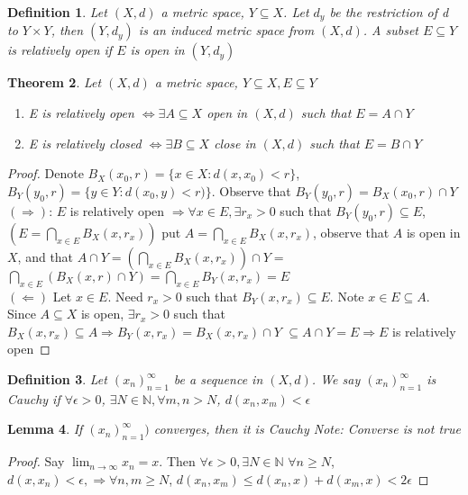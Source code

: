 \documentclass{article}
\newtheorem{theorem}{Theorem}[section]
\newtheorem{lemma}[theorem]{Lemma}
\newtheorem{definition}[theorem]{Definition}
\begin{document}
\begin{definition}
    Let $(X, d)$ a metric space, $Y \subseteq X$. Let $d_y$ be the restriction of d to
    $Y \times Y$, then $(Y, d_y)$ is an induced metric space from $(X, d)$. A subset
    $E\subseteq Y$ is relatively open if $E$ is open in $(Y, d_y)$
\end{definition}
\begin{theorem}
    Let $(X, d)$ a metric space, $Y \subseteq X, E \subseteq Y$
    \begin{enumerate}
        \item E is relatively open $\Leftrightarrow \exists A \subseteq X$ open in
            $(X,d)$ such that $E = A \cap Y$
        \item E is relatively closed $\Leftrightarrow \exists B \subseteq X$ close in
            $(X,d)$ such that $E = B \cap Y$
    \end{enumerate}
\end{theorem}
\begin{proof}
    Denote $B_{X}(x_0, r) = \{x \in X : d(x, x_0) < r\}$,
    $B_{Y}(y_0, r) = \{y \in Y : d(x_0, y) < r)\}$. Observe that
    $B_{Y}(y_0, r) = B_{X}(x_0, r) \cap Y$ \\
    $(\Rightarrow)$: $E$ is relatively open $\Rightarrow\forall x\in E,\exists r_x > 0$
    such that $B_{Y}(y_0, r) \subseteq E$, $(E = \bigcap\limits_{x\in E} B_{X}(x, r_x))$
    put $A = \bigcap\limits_{x\in E} B_{X}(x, r_x)$, observe that $A$ is open in $X$, and
    that $A \cap Y = (\bigcap\limits_{x\in E} B_{X}(x, r_x)) \cap Y =$
    $\bigcap\limits_{x\in E} (B_X(x, r) \cap Y)= \bigcap\limits_{x\in E} B_{Y}(x, r_x)=E$
    \\
    $(\Leftarrow)$ Let $x \in E$. Need $r_x > 0$ such that $B_{Y}(x, r_x) \subseteq E$.
    Note $x \in E \subseteq A$. Since $A \subseteq X$ is open, $\exists r_x > 0$ such
    that $B_{X}(x, r_x) \subseteq A \Rightarrow B_{Y}(x, r_x) = B_{X}(x, r_x) \cap Y$
    $\subseteq A \cap Y = E \Rightarrow E$ is relatively open
\end{proof}

\begin{definition}
    Let $(x_n)_{n=1}^{\infty}$ be a sequence in $(X, d)$. We say $(x_n)_{n=1}^{\infty}$
    is Cauchy if $\forall \epsilon > 0$, $\exists N \in \mathbb{N}, \forall m, n > N$,
    $d(x_n, x_m) < \epsilon$
\end{definition}

\begin{lemma}
    If $(x_n)_{n=1}^{\infty})$ converges, then it is Cauchy
    Note: Converse is not true
\end{lemma}
\begin{proof}
    Say $\lim_{n\to \infty} x_n = x$. Then $\forall \epsilon > 0,\exists N\in \mathbb{N}$
    $\forall n \geq N$, $d(x, x_n) < \epsilon, \Rightarrow \forall n,m \geq N$,
    $d(x_n, x_m) \leq d(x_n, x) + d(x_m, x) < 2\epsilon$
\end{proof}
\end{document}

